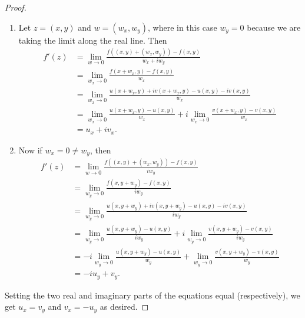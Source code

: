 \documentclass[12pt]{article}
\theoremstyle{definition}
\begin{document}
\begin{proof}\
	\begin{enumerate}[label=(\alph*)]
		\item Let $z = (x, y)$ and $w = (w_x, w_y)$, where in this case $w_y = 0$ because we are taking the limit along the real line.
		      Then \begin{align*}
			      f'(z) & = \lim_{w \to 0} \frac{f((x, y) + (w_x, w_y)) - f(x, y)}{w_x + iw_y}                                           \\
			            & = \lim_{w_x \to 0} \frac{f(x + w_x, y) - f(x, y)}{w_x}                                                         \\
			            & = \lim_{w_x \to 0} \frac{u(x + w_x, y) + iv(x + w_x, y)- u(x, y) - iv(x, y)}{w_x}                              \\
			            & = \lim_{w_x \to 0} \frac{u(x + w_x, y) - u(x, y)}{w_x} + i\lim_{w_x \to 0} \frac{v(x + w_x, y) - v(x, y)}{w_x} \\
			            & = u_x + iv_x.
		      \end{align*}
		\item Now if $w_x = 0 \neq w_y$, then \begin{align*}
			      f'(z) & = \lim_{w \to 0} \frac{f((x, y) + (w_x, w_y)) - f(x, y)}{iw_y}                                                   \\
			            & = \lim_{w_y \to 0} \frac{f(x, y + w_y) - f(x, y)}{iw_y}                                                          \\
			            & = \lim_{w_y \to 0} \frac{u(x, y + w_y) + iv(x, y + w_y)- u(x, y) - iv(x, y)}{iw_y}                               \\
			            & = \lim_{w_y \to 0} \frac{u(x, y + w_y) - u(x, y)}{iw_y} + i\lim_{w_y \to 0} \frac{v(x, y + w_y) - v(x, y)}{iw_y} \\
			            & = -i\lim_{w_y \to 0} \frac{u(x, y + w_y) - u(x, y)}{w_y} + \lim_{w_y \to 0} \frac{v(x, y + w_y) - v(x, y)}{w_y}  \\
			            & = -iu_y + v_y.
		      \end{align*}
	\end{enumerate}
	Setting the two real and imaginary parts of the equations equal (respectively), we get $u_x = v_y$ and $v_x = -u_y$ as desired.
\end{proof}
\end{document}

